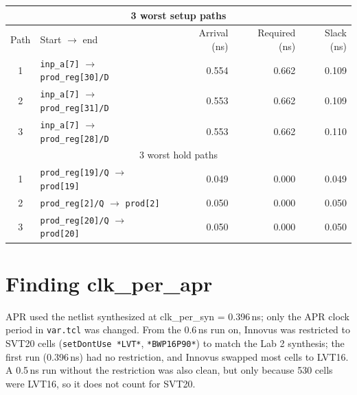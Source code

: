 \documentclass[11pt]{article}
\begin{document}
\begin{center}\small
\begin{tabular}{c|l|r|r|r}
\hline
\multicolumn{5}{c}{3 worst setup paths} \\
\hline
Path & Start $\rightarrow$ end & Arrival (ns) & Required (ns) & Slack (ns) \\
\hline
1 & \texttt{inp\_a[7]} $\rightarrow$ \texttt{prod\_reg[30]/D} & 0.554 & 0.662 & 0.109 \\
2 & \texttt{inp\_a[7]} $\rightarrow$ \texttt{prod\_reg[31]/D} & 0.553 & 0.662 & 0.109 \\
3 & \texttt{inp\_a[7]} $\rightarrow$ \texttt{prod\_reg[28]/D} & 0.553 & 0.662 & 0.110 \\
\hline
\multicolumn{5}{c}{3 worst hold paths} \\
\hline
1 & \texttt{prod\_reg[19]/Q} $\rightarrow$ \texttt{prod[19]} & 0.049 & 0.000 & 0.049 \\
2 & \texttt{prod\_reg[2]/Q} $\rightarrow$ \texttt{prod[2]} & 0.050 & 0.000 & 0.050 \\
3 & \texttt{prod\_reg[20]/Q} $\rightarrow$ \texttt{prod[20]} & 0.050 & 0.000 & 0.050 \\
\hline
\end{tabular}
\end{center}

\section*{Finding clk\_per\_apr}
APR used the netlist synthesized at clk\_per\_syn = 0.396\,ns; only the APR clock period in
\texttt{var.tcl} was changed. From the 0.6\,ns run on, Innovus was restricted to SVT20 cells
(\texttt{setDontUse *LVT*}, \texttt{*BWP16P90*}) to match the Lab 2 synthesis; the first run
(0.396\,ns) had no restriction, and Innovus swapped most cells to LVT16. A 0.5\,ns run without the
restriction was also clean, but only because 530 cells were LVT16, so it does not count for SVT20.
\end{document}
